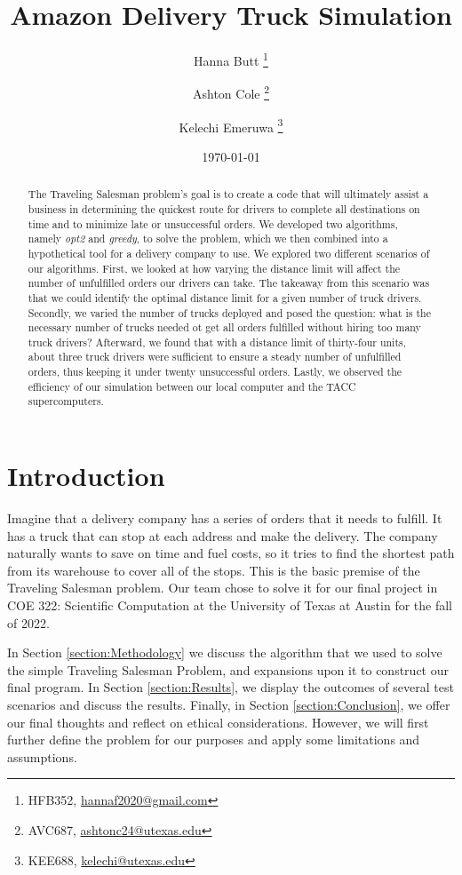 \documentclass[letterpaper]{article}
\title{Amazon Delivery Truck Simulation}
\author{Hanna Butt \thanks{HFB352, \href{mailto:hannaf2020@gmail.com}{hannaf2020@gmail.com}} \and Ashton Cole \thanks{AVC687, \href{mailto:ashtonc24@utexas.edu}{ashtonc24@utexas.edu}} \and Kelechi Emeruwa \thanks{KEE688, \href{mailto:kelechi@utexas.edu}{kelechi@utexas.edu}}}
\date{\today}
\begin{document}
    \maketitle

    \begin{abstract}
        The Traveling Salesman problem's goal is to create a code that will ultimately assist a business in determining the quickest route for drivers to complete all destinations on time and to minimize late or unsuccessful orders. We developed two algorithms, namely \emph{opt2} and \emph{greedy}, to solve the problem, which we then combined into a hypothetical tool for a delivery company to use. We explored two different scenarios of our algorithms. First, we looked at how varying the distance limit will affect the number of unfulfilled orders our drivers can take. The takeaway from this scenario was that we could identify the optimal distance limit for a given number of truck drivers. Secondly, we varied the number of trucks deployed and posed the question: what is the necessary number of trucks needed ot get all orders fulfilled without hiring too many truck drivers? Afterward, we found that with a distance limit of thirty-four units, about three truck drivers were sufficient to ensure a steady number of unfulfilled orders, thus keeping it under twenty unsuccessful orders. Lastly, we observed the efficiency of our simulation between our local computer and the TACC supercomputers.
    \end{abstract}

    \section{Introduction}
    \label{section:Introduction}
    Imagine that a delivery company has a series of orders that it needs to fulfill. It has a truck that can stop at each address and make the delivery. The company naturally wants to save on time and fuel costs, so it tries to find the shortest path from its warehouse to cover all of the stops. This is the basic premise of the Traveling Salesman problem. Our team chose to solve it for our final project in COE 322: Scientific Computation at the University of Texas at Austin for the fall of 2022.
    
    In Section \ref{section:Methodology} we discuss the algorithm that we used to solve the simple Traveling Salesman Problem, and expansions upon it to construct our final program. In Section \ref{section:Results}, we display the outcomes of several test scenarios and discuss the results. Finally, in Section \ref{section:Conclusion}, we offer our final thoughts and reflect on ethical considerations. However, we will first further define the problem for our purposes and apply some limitations and assumptions.
\end{document}
